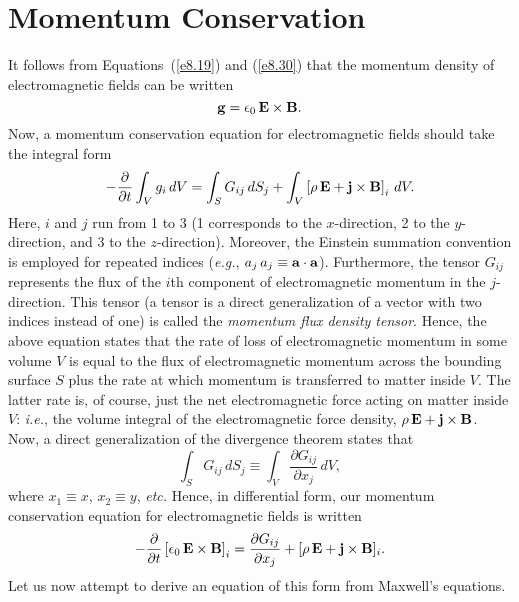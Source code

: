 \section{Momentum Conservation}\label{s8.4}
It follows from Equations~(\ref{e8.19}) and (\ref{e8.30}) that the momentum
density of electromagnetic fields can be written
\begin{equation}\label{e8.41x}
{\bf g} = \epsilon_0\,{\bf E}\times{\bf B}.
\end{equation}
Now, a momentum conservation equation for electromagnetic fields 
should take the integral form
\begin{equation}
-\frac{\partial}{\partial t}\int_V g_i\,dV = \int_S G_{ij}\,dS_j
+ \int_V \left[\rho\,{\bf E} + {\bf j}\times{\bf B}\right]_i\,dV.
\end{equation}
Here, $i$ and $j$ run from 1 to 3 (1 corresponds to the $x$-direction,
2 to the $y$-direction, and 3 to the $z$-direction). Moreover, the Einstein
summation convention is employed for repeated indices ({\em e.g.},
$a_j\,a_j\equiv {\bf a}\cdot{\bf a}$). Furthermore, the tensor
$G_{ij}$ represents the flux of the $i$th component of electromagnetic momentum  in the $j$-direction. This tensor (a tensor is a direct generalization of a vector with two indices instead of one) is called
the {\em momentum flux density tensor}. Hence, the above equation states
that the rate of loss of electromagnetic momentum in some volume $V$
is equal to the flux of electromagnetic momentum  across the bounding surface $S$ plus the rate at which momentum is transferred to matter inside $V$.
The latter rate is, of course, just the net electromagnetic force acting
on matter inside $V$: {\em i.e.}, the volume integral of the electromagnetic
force density, $\rho\,{\bf E} + {\bf j}\times{\bf B}$.
Now, a direct generalization of the divergence theorem states that
\begin{equation}
\int_S G_{ij}\,dS_j \equiv \int_V \frac {\partial G_{ij}}{\partial x_j}\,dV,
\end{equation}
where $x_1 \equiv x$, $x_2\equiv y$, {\em etc.} Hence, in differential form, our
momentum conservation equation for electromagnetic fields is written
\begin{equation}\label{e8.41}
-\frac{\partial}{\partial t}\left[\epsilon_0\,{\bf E}\times{\bf B}\right]_i =
\frac {\partial G_{ij}}{\partial x_j} + [\rho\,{\bf E} + {\bf j}\times{\bf B}]_i.
\end{equation}
Let us now attempt to derive an equation of this form from Maxwell's equations.

